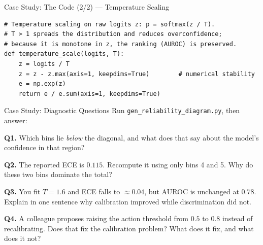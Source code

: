 \documentclass[9pt,t]{beamer}
\begin{document}
\begin{frame}[fragile]{Case Study: The Code (2/2) --- Temperature Scaling}
\begin{lstlisting}
# Temperature scaling on raw logits z: p = softmax(z / T).
# T > 1 spreads the distribution and reduces overconfidence;
# because it is monotone in z, the ranking (AUROC) is preserved.
def temperature_scale(logits, T):
    z = logits / T
    z = z - z.max(axis=1, keepdims=True)        # numerical stability
    e = np.exp(z)
    return e / e.sum(axis=1, keepdims=True)
\end{lstlisting}
\end{frame}

\begin{frame}{Case Study: Diagnostic Questions}
Run \texttt{gen\_reliability\_diagram.py}, then answer:

\medskip
\textbf{Q1.} Which bins lie \emph{below} the diagonal, and what does that say about
the model's confidence in that region?

\medskip
\textbf{Q2.} The reported ECE is $0.115$. Recompute it using only bins 4 and 5.
Why do these two bins dominate the total?

\medskip
\textbf{Q3.} You fit $T = 1.6$ and ECE falls to $\approx 0.04$, but AUROC is
unchanged at $0.78$. Explain in one sentence why calibration improved while
discrimination did not.

\medskip
\textbf{Q4.} A colleague proposes raising the action threshold from $0.5$ to
$0.8$ instead of recalibrating. Does that fix the calibration problem? What does
it fix, and what does it not?
\end{frame}
\end{document}
